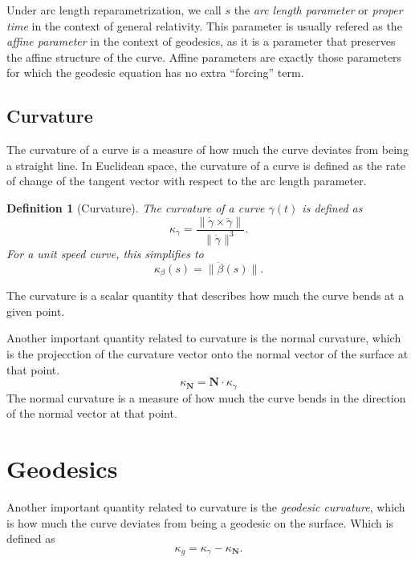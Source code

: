 \documentclass[12pt]{article}
\newtheorem{definition}{Definition}[section]
\begin{document}
Under arc length reparametrization, we call $s$ the \emph{arc length parameter} or \emph{proper time} in the context of general relativity.
This parameter is usually refered as the \emph{affine parameter} in the context of geodesics, as it is a parameter that preserves the affine structure of the curve.
Affine parameters are exactly those parameters for which the geodesic equation has no extra “forcing” term.

\subsection{Curvature}
The curvature of a curve is a measure of how much the curve deviates from being a straight line.
In Euclidean space, the curvature of a curve is defined as the rate of change of the tangent vector with respect to the arc length parameter.

\begin{definition}[Curvature]\label{def:curvature}
	The curvature of a curve $\gamma(t)$ is defined as
	\[
	\kappa_{\gamma} = \frac{\|\dot{\gamma}\times\ddot{\gamma}\|}{\|\dot{\gamma}\|^{3}}.
	\]
	For a unit speed curve, this simplifies to
	\[
	\kappa_{\beta}(s) = \|\ddot{\beta}(s)\|.
	\]
\end{definition}
The curvature is a scalar quantity that describes how much the curve bends at a given point.

Another important quantity related to curvature is the normal curvature, which is the projecction of the curvature vector onto the normal vector of the surface at that point.
\[
	\kappa_{\mathbf{N}} = \mathbf{N} \cdot \kappa_{\gamma}
\]
The normal curvature is a measure of how much the curve bends in the direction of the normal vector at that point.


\section{Geodesics}

Another important quantity related to curvature is the \emph{geodesic curvature}, which is how much the curve deviates from being a geodesic on the surface.
Which is defined as 
\begin{equation}\label{eq:geodesic-curvature}
	\kappa_{g} = \kappa_{\gamma} - \kappa_{\mathbf{N}}.
\end{equation}
\end{document}
